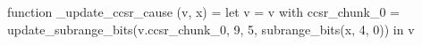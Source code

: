 function _update_ccsr_cause (v, x) = let v = { v with ccsr_chunk_0 = update_subrange_bits(v.ccsr_chunk_0, 9, 5, subrange_bits(x, 4, 0)) } in
  v
